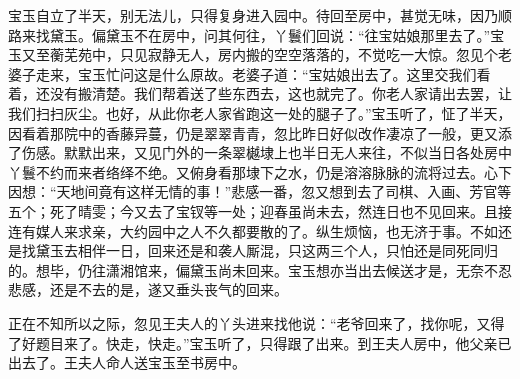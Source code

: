 宝玉自立了半天，别无法儿，只得复身进入园中。待回至房中，甚觉无味，因乃顺路来找黛玉。偏黛玉不在房中，问其何往，丫鬟们回说：“往宝姑娘那里去了。”宝玉又至蘅芜苑中，只见寂静无人，房内搬的空空落落的，不觉吃一大惊。忽见个老婆子走来，宝玉忙问这是什么原故。老婆子道：“宝姑娘出去了。这里交我们看着，还没有搬清楚。我们帮着送了些东西去，这也就完了。你老人家请出去罢，让我们扫扫灰尘。也好，从此你老人家省跑这一处的腿子了。”宝玉听了，怔了半天，因看着那院中的香藤异蔓，仍是翠翠青青，忽比昨日好似改作凄凉了一般，更又添了伤感。默默出来，又见门外的一条翠樾埭上也半日无人来往，不似当日各处房中丫鬟不约而来者络绎不绝。又俯身看那埭下之水，仍是溶溶脉脉的流将过去。心下因想：“天地间竟有这样无情的事！”悲感一番，忽又想到去了司棋、入画、芳官等五个；死了晴雯；今又去了宝钗等一处；迎春虽尚未去，然连日也不见回来。且接连有媒人来求亲，大约园中之人不久都要散的了。纵生烦恼，也无济于事。不如还是找黛玉去相伴一日，回来还是和袭人厮混，只这两三个人，只怕还是同死同归的。想毕，仍往潇湘馆来，偏黛玉尚未回来。宝玉想亦当出去候送才是，无奈不忍悲感，还是不去的是，遂又垂头丧气的回来。

正在不知所以之际，忽见王夫人的丫头进来找他说：“老爷回来了，找你呢，又得了好题目来了。快走，快走。”宝玉听了，只得跟了出来。到王夫人房中，他父亲已出去了。王夫人命人送宝玉至书房中。

